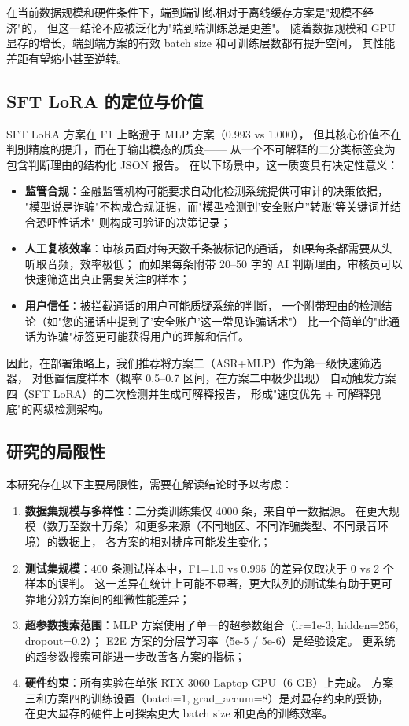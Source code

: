 \documentclass[11pt,a4paper]{ctexart}
\begin{document}
在当前数据规模和硬件条件下，端到端训练相对于离线缓存方案是"规模不经济"的，
但这一结论不应被泛化为"端到端训练总是更差"。
随着数据规模和 GPU 显存的增长，端到端方案的有效 batch size 和可训练层数都有提升空间，
其性能差距有望缩小甚至逆转。

\subsection{SFT LoRA 的定位与价值}

SFT LoRA 方案在 F1 上略逊于 MLP 方案（0.993 vs 1.000），
但其核心价值不在判别精度的提升，而在于输出模态的质变——
从一个不可解释的二分类标签变为包含判断理由的结构化 JSON 报告。
在以下场景中，这一质变具有决定性意义：

\begin{itemize}
  \item \textbf{监管合规}：金融监管机构可能要求自动化检测系统提供可审计的决策依据，
  "模型说是诈骗"不构成合规证据，而"模型检测到'安全账户''转账'等关键词并结合恐吓性话术"
  则构成可验证的决策记录；
  \item \textbf{人工复核效率}：审核员面对每天数千条被标记的通话，
  如果每条都需要从头听取音频，效率极低；
  而如果每条附带 20--50 字的 AI 判断理由，审核员可以快速筛选出真正需要关注的样本；
  \item \textbf{用户信任}：被拦截通话的用户可能质疑系统的判断，
  一个附带理由的检测结论（如"您的通话中提到了'安全账户'这一常见诈骗话术"）
  比一个简单的"此通话为诈骗"标签更可能获得用户的理解和信任。
\end{itemize}

因此，在部署策略上，我们推荐将方案二（ASR+MLP）作为第一级快速筛选器，
对低置信度样本（概率 0.5--0.7 区间，在方案二中极少出现）
自动触发方案四（SFT LoRA）的二次检测并生成可解释报告，
形成"速度优先 + 可解释兜底"的两级检测架构。

\subsection{研究的局限性}

本研究存在以下主要局限性，需要在解读结论时予以考虑：

\begin{enumerate}[label=(\arabic*)]
  \item \textbf{数据集规模与多样性}：二分类训练集仅 4000 条，来自单一数据源。
  在更大规模（数万至数十万条）和更多来源（不同地区、不同诈骗类型、不同录音环境）的数据上，
  各方案的相对排序可能发生变化；
  \item \textbf{测试集规模}：400 条测试样本中，F1=1.0 vs 0.995 的差异仅取决于 0 vs 2 个样本的误判。
  这一差异在统计上可能不显著，更大队列的测试集有助于更可靠地分辨方案间的细微性能差异；
  \item \textbf{超参数搜索范围}：MLP 方案使用了单一的超参数组合（lr=1e-3, hidden=256, dropout=0.2）；
  E2E 方案的分层学习率（5e-5 / 5e-6）是经验设定。
  更系统的超参数搜索可能进一步改善各方案的指标；
  \item \textbf{硬件约束}：所有实验在单张 RTX 3060 Laptop GPU（6 GB）上完成。
  方案三和方案四的训练设置（batch=1, grad\_accum=8）是对显存约束的妥协，
  在更大显存的硬件上可探索更大 batch size 和更高的训练效率。
\end{enumerate}
\end{document}

